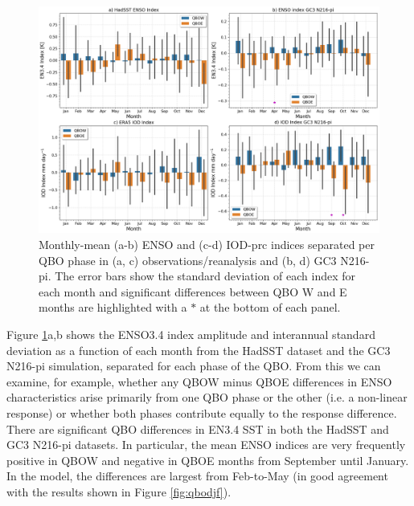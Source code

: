 \begin{figure}[t!]
\centering
 \noindent
 \includegraphics[width=\linewidth]{figures/iod_barplot.png}
\caption[IOD and ENSO frequency changes on QBO phase.]{ Monthly-mean (a-b) ENSO and (c-d) IOD-prc indices separated per QBO phase in (a, c) observations/reanalysis and (b, d) GC3 N216-pi. The error bars show the standard deviation of each index for each month and significant differences between QBO W and E months are highlighted with a $*$ at the bottom of each panel.  }
\label{fig:iod_barplot}
\end{figure}

Figure \ref{fig:iod_barplot}a,b shows the ENSO3.4 index amplitude and interannual standard deviation as a function of each month from the HadSST dataset and the GC3 N216-pi simulation, separated for each phase of the QBO. From this we can examine, for example, whether any QBOW minus QBOE differences in ENSO characteristics arise primarily from one QBO phase or the other (i.e. a non-linear response) or whether both phases contribute equally to the response difference.  There are significant QBO differences in EN3.4 SST in both the HadSST and GC3 N216-pi datasets. In particular, the mean ENSO indices are very frequently positive in QBOW and negative in QBOE months from September until January. In the model, the differences are largest from Feb-to-May (in good agreement with the results shown in Figure \ref{fig:qbodjf}).


